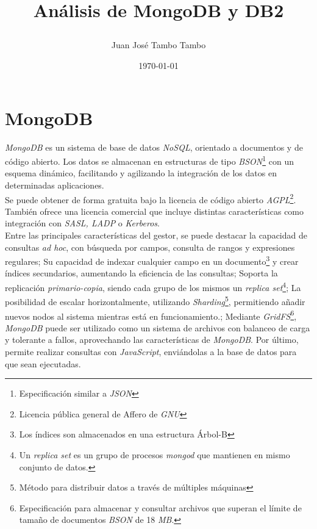 \documentclass[11pt,a4paper]{article}
\begin{document}
	
\begin{titlepage}
\title{
\begin{Huge}
\textbf{Análisis de MongoDB y DB2}
\end{Huge}
}

\author{Juan José Tambo Tambo}
\date{\today}

\end{titlepage}

\newpage

\section{MongoDB}

\emph{MongoDB} es un sistema de base de datos \emph{NoSQL}, orientado a documentos y de código abierto. Los datos se almacenan en estructuras de tipo \emph{BSON}\footnote{Especificación similar a \emph{JSON}} con un esquema dinámico, facilitando y agilizando la integración de los datos en determinadas aplicaciones.\\
Se puede obtener de forma gratuita bajo la licencia de código abierto  \emph{AGPL}\footnote{Licencia pública general de Affero de \emph{GNU}}. También ofrece una licencia comercial que incluye distintas características como integración con \emph{SASL, LADP} o \emph{Kerberos}.\cite{WIKI:1}\\

Entre las principales características del gestor\cite{WIKI:2}, se puede destacar la capacidad de consultas \emph{ad hoc}, con búsqueda por campos, consulta de rangos y expresiones regulares; Su capacidad de indexar cualquier campo en un documento\footnote{Los índices son almacenados en una estructura Árbol-B} y crear índices secundarios, aumentando la eficiencia de las consultas\cite{MDB:1}; Soporta la replicación \emph{primario-copia}, siendo cada grupo de los mismos un \emph{replica set}\footnote{Un \emph{replica set} es un grupo de procesos \emph{mongod} que mantienen en mismo conjunto de datos.\cite{MDB:2}}; La posibilidad de escalar horizontalmente, utilizando \emph{Sharding}\footnote{Método para distribuir datos a través de múltiples máquinas}, permitiendo añadir nuevos nodos al sistema mientras está en funcionamiento.\cite{MDB:3};  Mediante \emph{GridFS}\footnote{Especificación para almacenar y consultar archivos que superan el límite de tamaño de documentos \emph{BSON} de 18 \emph{MB}.\cite{MDB:4}}, \emph{MongoDB} puede ser utilizado como un sistema de archivos con balanceo de carga y tolerante a fallos, aprovechando las características de \emph{MongoDB}. Por último, permite realizar consultas con \emph{JavaScript}\cite{MDB:5}, enviándolas a la base de datos para que sean ejecutadas.\\
\end{document}
